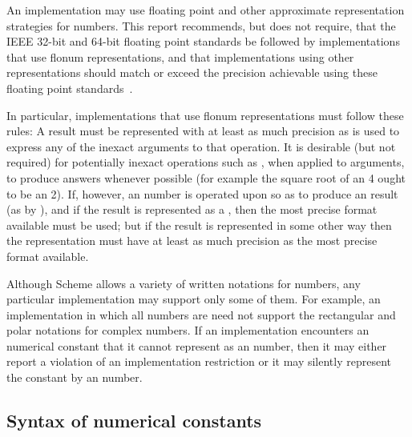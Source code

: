 \vest An implementation may use floating point and other approximate 
representation strategies for  numbers.
%
%
This report recommends, but does not require, that the IEEE 32-bit
and 64-bit floating point standards be followed by implementations that use
flonum representations, and that implementations using
other representations should match or exceed the precision achievable
using these floating point standards~\cite{IEEE}.

\vest In particular, implementations that use flonum representations
must follow these rules: A  result
must be represented with at least as much precision as is used to express any of
the inexact arguments to that operation.  It is desirable (but not required) for
potentially inexact operations such as , when applied to 
arguments, to produce  answers whenever possible (for example the
square root of an  4 ought to be an  2).
If, however, an
 number is operated upon so as to produce an  result
(as by ), and if the result is represented as a , then
the most precise  format available must be used; but if the result
is represented in some other way then the representation must have at least as
much precision as the most precise  format available.

Although Scheme allows a variety of written
notations for
numbers, any particular implementation may support only some of them.
For example, an implementation in which all numbers are 
need not support the rectangular and polar notations for complex
numbers.  If an implementation encounters an  numerical constant that
it cannot represent as an  number, then it may either report a
violation of an implementation restriction or it may silently represent the
constant by an  number.


\subsection{Syntax of numerical constants}
\label{numbernotations}


